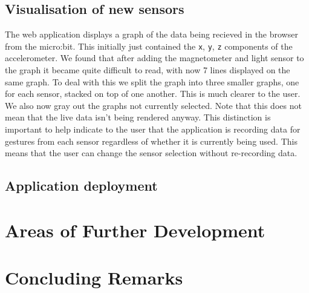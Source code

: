 \documentclass{article}
\begin{document}

\subsection{Visualisation of new sensors}%
\label{subsec:sensorvis}
The web application displays a graph of the data being recieved in the browser from the micro:bit. This initially just contained the \verb|x|, \verb|y|, \verb|z| components of the accelerometer. We found that after adding the magnetometer and light sensor to the graph it became quite difficult to read, with now 7 lines displayed on the same graph. To deal with this we split the graph into three smaller graphs, one for each sensor, stacked on top of one another. This is much clearer to the user. We also now gray out the graphs not currently selected. Note that this does not mean that the live data isn't being rendered anyway. This distinction is important to help indicate to the user that the application is recording data for gestures from each sensor regardless of whether it is currently being used. This means that the user can change the sensor selection without re-recording data.

\subsection{Application deployment}%
\label{subsec:deployment}

\section{Areas of Further Development}%
\label{sec:development}

\section{Concluding Remarks}%
\label{sec:conclusion}


\raggedright
\end{document}
